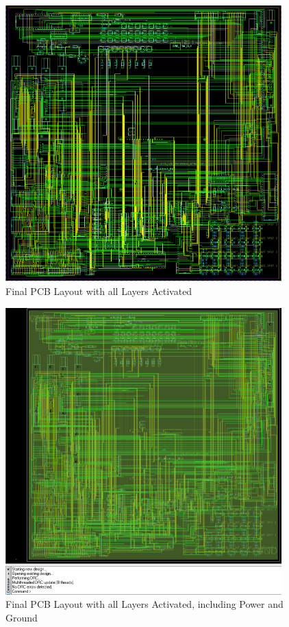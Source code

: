 \begin{appendices}
        \begin{figure}[ht]
            \begin{center}
                \includegraphics[width=0.95\textwidth]{figures/board.png}
                \caption{Final PCB Layout with all Layers Activated} \label{fig:board}
            \end{center}
        \end{figure}

        \begin{figure}[ht]
            \begin{center}
                \includegraphics[width=0.95\textwidth]{figures/all.png}
                \caption{Final PCB Layout with all Layers Activated, including Power and Ground} \label{fig:all}
            \end{center}
        \end{figure}


\end{appendices}
